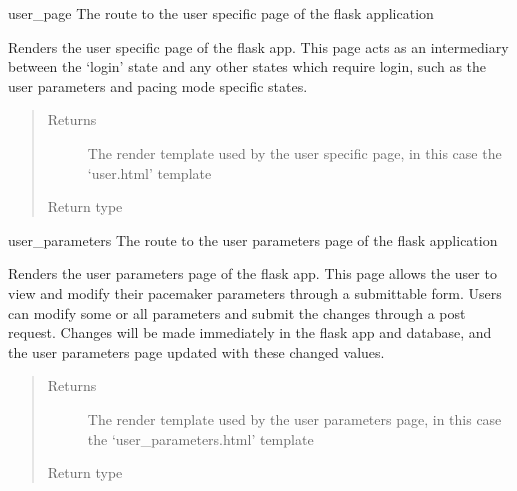 \documentclass[letterpaper,10pt,english]{sphinxmanual}
\begin{document}
\begin{fulllineitems}
\label{\detokenize{flaskapp:flaskapp.app.user_page}}
user\_page The route to the user specific page of the flask application

Renders the user specific page of the flask app. This page acts as an intermediary
between the ‘login’ state and any other states which require login, such as the
user parameters and pacing mode specific states.
\begin{quote}\begin{description}
\item[{Returns}] \leavevmode
The render template used by the user specific page, in this case the ‘user.html’ template

\item[{Return type}] \leavevmode
{}

\end{description}\end{quote}

\end{fulllineitems}


\begin{fulllineitems}
\label{\detokenize{flaskapp:flaskapp.app.user_parameters}}
user\_parameters The route to the user parameters page of the flask application

Renders the user parameters page of the flask app. This page allows the user to
view and modify their pacemaker parameters through a submittable form. Users can
modify some or all parameters and submit the changes through a post request. Changes
will be made immediately in the flask app and database, and the user parameters page
updated with these changed values.
\begin{quote}\begin{description}
\item[{Returns}] \leavevmode
The render template used by the user parameters page, in this case the ‘user\_parameters.html’ template

\item[{Return type}] \leavevmode
{}

\end{description}\end{quote}

\end{fulllineitems}
\end{document}
